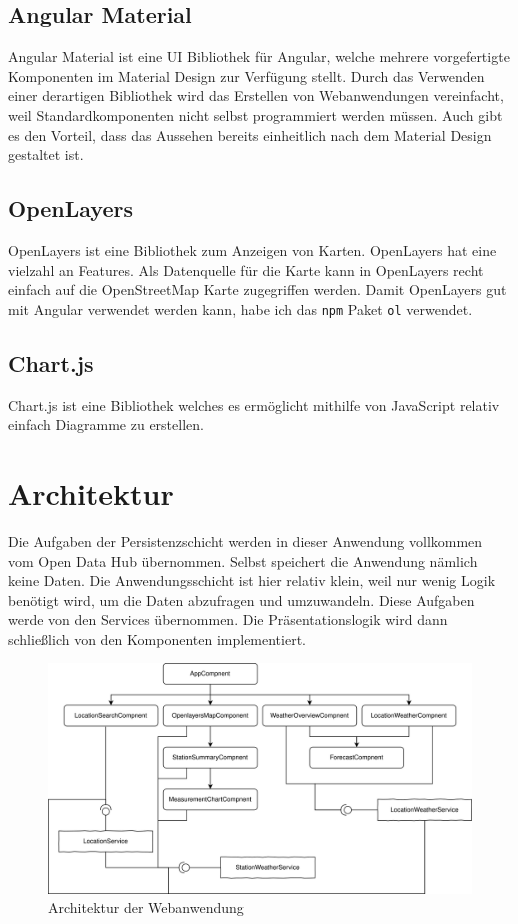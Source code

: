 \documentclass[a4paper,12pt]{article}
\begin{document}
\subsection{Angular Material}
Angular Material ist eine UI Bibliothek für Angular, welche mehrere vorgefertigte
Komponenten im Material Design zur Verfügung stellt. Durch das Verwenden einer
derartigen Bibliothek wird das Erstellen von Webanwendungen vereinfacht, weil
Standardkomponenten nicht selbst programmiert werden müssen. Auch gibt es den
Vorteil, dass das Aussehen bereits einheitlich nach dem Material Design gestaltet
ist.

\subsection{OpenLayers}
OpenLayers ist eine Bibliothek zum Anzeigen von Karten. OpenLayers hat eine
vielzahl an Features. Als Datenquelle für die Karte kann in OpenLayers recht
einfach auf die OpenStreetMap Karte zugegriffen werden. Damit OpenLayers gut mit
Angular verwendet werden kann, habe ich das \texttt{npm} Paket \texttt{ol} verwendet.

\subsection{Chart.js}
Chart.js ist eine Bibliothek welches es ermöglicht mithilfe von JavaScript
relativ einfach Diagramme zu erstellen.

\section{Architektur}
Die Aufgaben der Persistenzschicht werden in dieser Anwendung vollkommen vom
Open Data Hub übernommen. Selbst speichert die Anwendung nämlich keine Daten.
Die Anwendungsschicht ist hier relativ klein, weil nur wenig Logik benötigt wird,
um die Daten abzufragen und umzuwandeln. Diese Aufgaben werde von den Services
übernommen. Die Präsentationslogik wird dann schließlich von den Komponenten
implementiert.

\begin{figure}[H]
    \centering
    \includegraphics[width=\linewidth]{assets/wa-architecture.png}
    \caption{Architektur der Webanwendung}
    \label{fig:waarch}
\end{figure}
\end{document}
